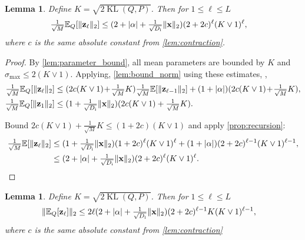 \documentclass[twoside]{article}
\renewcommand{\ss}[1]{_{\text{#1}}}
\newcommand{\vx}{\mathbf{x}}
\newcommand{\vz}{\mathbf{z}}
\newcommand{\E}{\mathbb{E}}
\renewcommand{\P}{\mathbb{P}}
\newcommand{\Q}{\mathbb{Q}}
\renewcommand{\Q}{\ensuremath{Q}}
\renewcommand{\P}{\ensuremath{P}}
\newcommand{\KL}{\operatorname{KL}}
\renewcommand{\ss}[1]{_{\text{#1}}}        %
\DeclarePairedDelimiter\norm{\|}{\|}             %
\DeclarePairedDelimiter\abs{|}{|}                %
\theoremstyle{theoremstyle}
\newtheorem{lemma}[theorem]{Lemma}
\begin{document}
\begin{lemma}\label{lem:expected-norm-bound}
Define $K = \sqrt{2\KL(\Q,\P)}$. Then for $1 \le \ell \leq L$
\begin{align}
     \tfrac1{\sqrt{M}}\E_Q[\norm{\vz_\ell}_2] &\le (2 + \abs{\alpha} + \tfrac1{\sqrt{D\ss{i}}}\norm{\vx}_2)(2 + 2c)^\ell(K \lor 1)^\ell,
\end{align}
where $c$ is the same absolute constant from \cref{lem:contraction}.
\end{lemma}
\begin{proof}
By \cref{lem:parameter_bound}, all mean parameters are bounded by $K$ and $\sigma\ss{max} \le 2 (K \lor 1)$. Applying, \cref{lem:bound_norm} using these estimates, ,
\begin{align}
    \tfrac1{\sqrt{M}}\E_Q[\norm{\vz_\ell}_2]
    &\le (2c(K \lor 1) \!+\! \tfrac1{\sqrt{M}}K) \tfrac1{\sqrt{M}}\E[\norm{\vz_{\ell - 1}}_2] +
    (1 + \abs{\alpha})(2c(K \lor 1) \!+\! \tfrac1{\sqrt{M}}K), \\
    \tfrac1{\sqrt{M}}\E_Q[\norm{\vz_1}_2]
    &\le (1 + \tfrac1{\sqrt{D\ss{i}}}\norm{\vx}_2)(2c(K \lor 1) + \tfrac1{\sqrt{M}}K).
\end{align}

Bound $2c(K \lor 1) + \tfrac1{\sqrt{M}} K \le (1 + 2c)(K \lor 1)$ and apply \cref{prop:recursion}:
\begin{align}
    \tfrac1{\sqrt{M}}\E[\norm{\vz_\ell}_2]
    &\le (1 + \tfrac1{\sqrt{D\ss{i}}}\norm{\vx}_2)(1 + 2c)^\ell(K \lor 1)^\ell + (1 + \abs{\alpha})(2 + 2c)^{\ell - 1}(K \lor 1)^{\ell - 1}, \\
    &\le (2 + \abs{\alpha} + \tfrac1{\sqrt{D\ss{i}}}\norm{\vx}_2)(2 + 2c)^\ell(K \lor 1)^\ell. \qedhere
\end{align}
\end{proof}
\begin{lemma}\label{lem:norm-expecation}
    Define $K = \sqrt{2\KL(\Q,\P)}$. Then for $1 \le \ell \leq L$
\begin{align}
     \norm{\E_Q[\vz_\ell]}_2 &\le 2\ell (2 + \abs{\alpha} + \tfrac1{\sqrt{D\ss{i}}}\norm{\vx}_2)(2 + 2c)^{\ell-1}K(K \lor 1)^{\ell-1},
\end{align}
where $c$ is the same absolute constant from \cref{lem:contraction}
\end{lemma}
\end{document}
